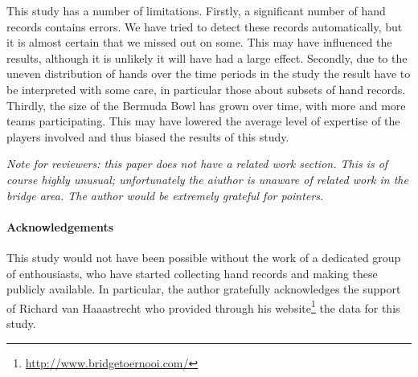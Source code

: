 \documentclass{icga}
\begin{document}
This study has a number of limitations. Firstly, a significant number
of hand records contains errors. We have tried to detect these records
automatically, but it is almost certain that we missed out on some.
This may have influenced the results, although it is unlikely it will
have had a large effect. Secondly, due to the uneven distribution of
hands over the time periods in the study the result have to be
interpreted with some care, in particular those about subsets of hand
records. Thirdly, the size of the Bermuda Bowl has grown over time,
with more and more teams participating. This may have lowered the
average level of expertise of the players involved and thus biased the
results of this study.

\emph{Note for reviewers: this paper does not have a related work
  section. This is of course highly unusual; unfortunately the aiuthor
  is unaware of related work in the bridge area. The author would be
  extremely grateful for pointers. }



\paragraph{Acknowledgements}

This study would not have been possible without the work of a
dedicated group of enthousiasts, who have started collecting hand
records and making these publicly available. In particular, the author
gratefully acknowledges the support of Richard van Haaastrecht who
provided through his website\footnote{%
\url{http://www.bridgetoernooi.com/}} the data for this study.


\end{document}
